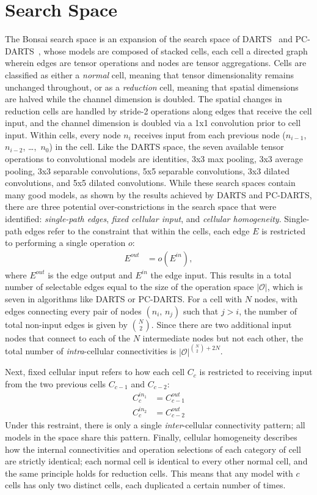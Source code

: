 \section{Search Space} \label{sect:bonsai_search_space}
The Bonsai search space is an expansion of the search space of DARTS~\citep{liu2018} and PC-DARTS~\citep{xu2020}, whose models are
composed of stacked cells, each cell a directed graph wherein edges are tensor operations and nodes are tensor aggregations.
Cells are classified as either a \textit{normal} cell, meaning that tensor dimensionality remains unchanged throughout,
or as a \textit{reduction} cell, meaning that spatial dimensions are halved while the channel dimension is doubled. The spatial changes in reduction
cells are handled by stride-2 operations along edges that receive the cell input, and the channel dimension is doubled via a 1x1 convolution prior to
cell input. Within cells, every node $n_i$ receives input
from each previous node ($n_{i-1}$, $n_{i-2}$, \dots,$\,$ $n_0$) in the cell. Like the DARTS space, the seven available tensor operations
to convolutional models are identities, 3x3 max pooling, 3x3 average pooling, 3x3 separable convolutions, 5x5 separable
convolutions, 3x3 dilated convolutions, and 5x5 dilated convolutions. While these search spaces contain many good models, as shown
by the results achieved by DARTS and PC-DARTS, there are three potential over-constrictions in the search space that were identified:
\textit{single-path edges}, \textit{fixed cellular input}, and \textit{cellular homogeneity}. Single-path edges refer to the
constraint that within the cells, each edge $E$ is restricted to performing a single operation $o$:
			\begin{align}
				E^{out} &= o (E^{in}),
			\end{align}
where $E^{out}$ is the edge output and $E^{in}$ the edge input. This results in a total number of selectable edges equal to the size of the operation space $|\mathcal{O}|$, which
is seven in algorithms like DARTS or PC-DARTS. For a cell with $N$ nodes, with edges connecting every pair of nodes
$(n_i, \, n_j)$ such that $j>i$, the number of total non-input edges is given by $\binom{N}{2}$. Since there are two
additional input nodes that connect to each of the $N$ intermediate nodes but not each other,
the total number of \textit{intra}-cellular connectivities is $|\mathcal{O}| ^ {\binom{N}{2} + 2N}$.

Next, fixed cellular input refers to how each cell $C_c$ is restricted to receiving input from the two previous cells $C_{c-1}$ and $C_{c-2}$:
		\begin{align}
			C^{in_1}_c &= C^{out}_{c-1} \\
			C^{in_2}_c &= C^{out}_{c-2}
		\end{align}
Under this restraint, there is only a single \textit{inter}-cellular connectivity pattern; all models in the space share this
pattern. Finally, cellular homogeneity describes how
the internal connectivities and operation selections of each category of cell are strictly identical; each normal cell is identical to
every other normal cell, and the same principle holds for reduction cells. This means that any model with $c$ cells has only two
distinct cells, each duplicated a certain number of times.

